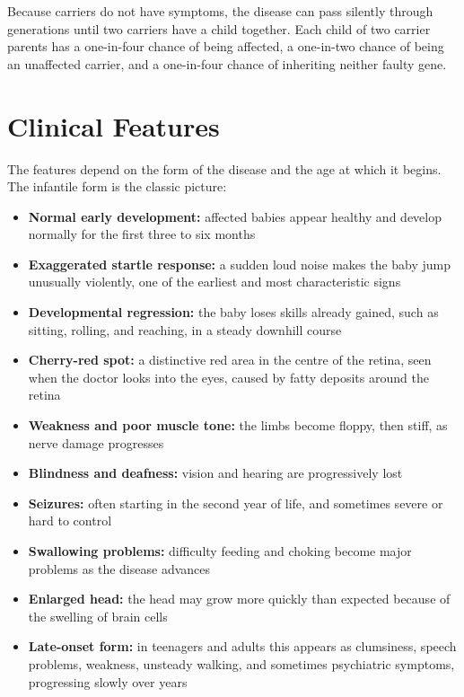 Because carriers do not have symptoms, the disease can pass silently through generations until two carriers have a child together. Each child of two carrier parents has a one-in-four chance of being affected, a one-in-two chance of being an unaffected carrier, and a one-in-four chance of inheriting neither faulty gene.

\section*{Clinical Features}
The features depend on the form of the disease and the age at which it begins. The infantile form is the classic picture:

\begin{itemize}
    \item \textbf{Normal early development:} affected babies appear healthy and develop normally for the first three to six months
    \item \textbf{Exaggerated startle response:} a sudden loud noise makes the baby jump unusually violently, one of the earliest and most characteristic signs
    \item \textbf{Developmental regression:} the baby loses skills already gained, such as sitting, rolling, and reaching, in a steady downhill course
    \item \textbf{Cherry-red spot:} a distinctive red area in the centre of the retina, seen when the doctor looks into the eyes, caused by fatty deposits around the retina
    \item \textbf{Weakness and poor muscle tone:} the limbs become floppy, then stiff, as nerve damage progresses
    \item \textbf{Blindness and deafness:} vision and hearing are progressively lost
    \item \textbf{Seizures:} often starting in the second year of life, and sometimes severe or hard to control
    \item \textbf{Swallowing problems:} difficulty feeding and choking become major problems as the disease advances
    \item \textbf{Enlarged head:} the head may grow more quickly than expected because of the swelling of brain cells
    \item \textbf{Late-onset form:} in teenagers and adults this appears as clumsiness, speech problems, weakness, unsteady walking, and sometimes psychiatric symptoms, progressing slowly over years
\end{itemize}

